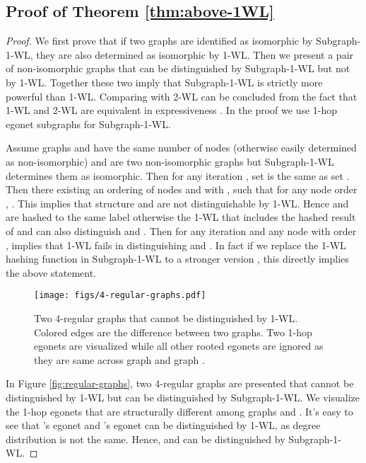 \subsection{Proof of Theorem \ref{thm:above-1WL}}\label{apdx:proof-of-above-1WL}
\begin{proof}
We first prove that if two graphs are identified as isomorphic by Subgraph-1-WL, they are also determined as isomorphic by 1-WL. Then we present a pair of non-isomorphic graphs that can be distinguished by Subgraph-1-WL but not by 1-WL. Together these two imply that Subgraph-1-WL is strictly more powerful than 1-WL.  Comparing with 2-WL can be concluded from the fact that 1-WL and 2-WL are equivalent in expressiveness \citep{maron2019provably}. In the proof we use 1-hop egonet subgraphs for Subgraph-1-WL.

Assume graphs  and  have the same number of nodes (otherwise easily determined as non-isomorphic) and are two non-isomorphic graphs 
but Subgraph-1-WL determines them as isomorphic. Then for any iteration , set  is the same as set . Then there existing an ordering of nodes  and  with , such that for any node order , . This implies that structure  and  are not distinguishable by 1-WL. Hence  and  are hashed to the same label otherwise the 1-WL that includes the hashed result of  and  can also distinguish  and . Then for any iteration  and any node with order ,  implies that 1-WL fails in distinguishing  and . In fact if we replace the 1-WL hashing function in Subgraph-1-WL to a stronger version , this directly implies the above statement. 

\begin{figure}[h]
    \centering
    \texttt{[image: figs/4-regular-graphs.pdf]}
    \caption{Two 4-regular graphs that cannot be distinguished by 1-WL. Colored edges are the difference between two graphs. Two 1-hop egonets are visualized while all other rooted egonets are ignored as they are same across graph  and graph . }\label{fig:regular-graphs}
    \label{fig:my_label}
\end{figure}

In Figure \ref{fig:regular-graphs}, two 4-regular graphs are presented that cannot be distinguished by 1-WL but can be distinguished by Subgraph-1-WL. We visualize the 1-hop egonets that are structurally different among graphs  and . It's easy to see that 's egonet  and 's egonet  can be distinguished by 1-WL, as degree distribution is not the same. Hence,  and  can be distinguished by Subgraph-1-WL. 
\end{proof}


